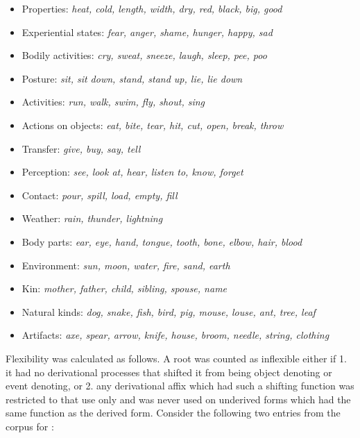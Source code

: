 \documentclass[output=paper]{langsci/langscibook}
\begin{document}
\begin{itemize}
\item Properties: \textit{heat, cold, length, width, dry, red, black, big, good}

\item Experiential states: \textit{fear, anger, shame, hunger, happy, sad}

\item Bodily activities: \textit{cry, sweat, sneeze, laugh, sleep, pee, poo}

\item Posture: \textit{sit, sit down, stand, stand up, lie, lie down}

\item Activities: \textit{run, walk, swim, fly, shout, sing}

\item Actions on objects: \textit{eat, bite, tear, hit, cut, open, break, throw}

\item Transfer: \textit{give, buy, say, tell}

\item Perception: \textit{see, look at, hear, listen to, know, forget}

\item Contact: \textit{pour, spill, load, empty, fill}

\item Weather: \textit{rain, thunder, lightning}

\item Body parts: \textit{ear, eye, hand, tongue, tooth, bone, elbow, hair, blood}

\item Environment: \textit{sun, moon, water, fire, sand, earth}

\item Kin: \textit{mother, father, child, sibling, spouse, name}

\item Natural kinds: \textit{dog, snake, fish, bird, pig, mouse, louse, ant, tree, leaf}

\item Artifacts: \textit{axe, spear, arrow, knife, house, broom, needle, string, clothing}

\end{itemize}

 Flexibility was calculated as follows. A root was counted as inflexible either if 1. it had no derivational  processes that shifted it from being object denoting or event denoting, or 2. any derivational affix which had such a shifting function was restricted to that use only and was never used on underived forms which had the same function as the derived form. Consider the following two entries from the corpus for :
\end{document}
